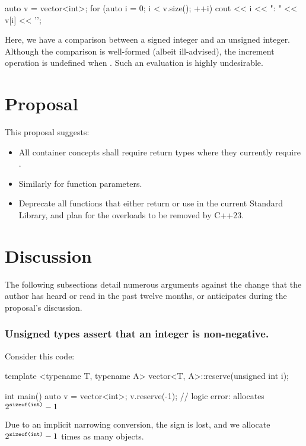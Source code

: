 \begin{codeblock}
auto v = vector<int>{};
for (auto i = 0; i < v.size(); ++i)
   cout << i << ": " << v[i] << '\n';
\end{codeblock}

Here, we have a comparison between a signed integer and an unsigned integer. Although the comparison
is well-formed (albeit ill-advised), the increment operation is undefined when
. Such an evaluation is highly undesirable.

\section*{Proposal}
This proposal suggests:

\begin{itemize}
   \item All container concepts shall require  return types where they
         currently require .
   \item Similarly for function parameters.
   \item Deprecate all functions that either return or use  in the current Standard
         Library, and plan for the  overloads to be removed by C++23.
\end{itemize}

\section*{Discussion}
The following subsections detail numerous arguments against the change that the author has heard or
read in the past twelve months, or anticipates during the proposal's discussion.

\subsubsection*{Unsigned types assert that an integer is non-negative.}
Consider this code:

\begin{codeblock}
template <typename T, typename A>
vector<T, A>::reserve(unsigned int i);

int main()
{
   auto v = vector<int>{};
   v.reserve(-1); // logic error: allocates $2^{\texttt{sizeof(int)}} - 1$
}
\end{codeblock}

Due to an implicit narrowing conversion, the sign is lost, and we allocate $2^{\texttt{sizeof(int)}}
- 1$ times as many objects.


